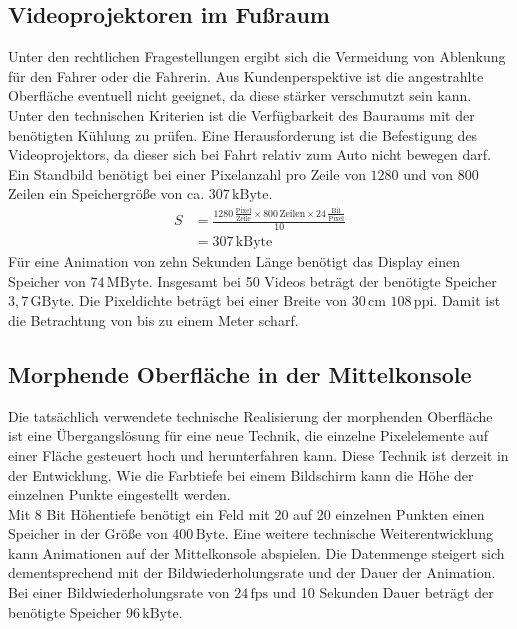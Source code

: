 \subsection{Videoprojektoren im Fußraum}
Unter den rechtlichen Fragestellungen ergibt sich die Vermeidung von Ablenkung für den Fahrer oder die Fahrerin.
Aus Kundenperspektive ist die angestrahlte Oberfläche eventuell nicht geeignet, da diese stärker verschmutzt sein kann. \\
Unter den technischen Kriterien ist die Verfügbarkeit des Bauraums mit der benötigten Kühlung zu prüfen. Eine Herausforderung ist die Befestigung des Videoprojektors, da dieser sich bei Fahrt relativ zum Auto nicht bewegen darf. 
Ein Standbild benötigt bei einer Pixelanzahl pro Zeile von $ 1280 $ und von $ 800 $ Zeilen ein Speichergröße von ca. $ 307\,\mathrm{kByte}$. 
\begin{align}
	S &= \frac{1280\,\frac{\mathrm{Pixel}}{\mathrm{Zeile}}\times 800\,\mathrm{Zeilen} \times 24\,\frac{\mathrm{Bit}}{\mathrm{Pixel}}}{10} \\
	&= 307\,\mathrm{kByte}
\end{align}
Für eine Animation von zehn Sekunden Länge benötigt das Display einen Speicher von $ 74\,\mathrm{MByte}$.
Insgesamt bei 50 Videos beträgt der benötigte Speicher $ 3,7\,\mathrm{GByte}$.
Die Pixeldichte beträgt bei einer Breite von $ 30\,\mathrm{cm} $ $ 108\,\mathrm{ppi} $. Damit ist die Betrachtung von bis zu einem Meter scharf.
\subsection{Morphende Oberfläche in der Mittelkonsole}
Die tatsächlich verwendete technische Realisierung der morphenden Oberfläche ist eine Übergangslösung für eine neue Technik, die einzelne Pixelelemente auf einer Fläche gesteuert hoch und herunterfahren kann. Diese Technik ist derzeit in der Entwicklung. Wie die Farbtiefe bei einem Bildschirm kann die Höhe der einzelnen Punkte eingestellt werden. \\
Mit 8 Bit Höhentiefe benötigt ein Feld mit 20 auf 20 einzelnen Punkten einen Speicher in der Größe von $ 400\,\mathrm{Byte}$.
Eine weitere technische Weiterentwicklung kann Animationen auf der Mittelkonsole abspielen. Die Datenmenge steigert sich dementsprechend mit der Bildwiederholungsrate und der Dauer der Animation. Bei einer Bildwiederholungsrate von $ 24\,\mathrm{fps} $ und 10 Sekunden Dauer beträgt der benötigte Speicher $ 96\,\mathrm{kByte}$.
